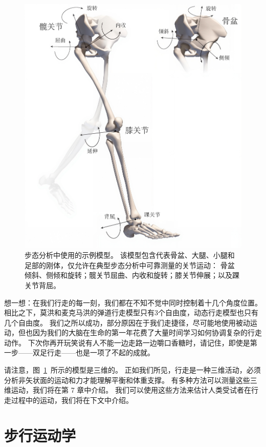 \begin{figure}[!htb]
	\centering
	\includegraphics[width=1.0\linewidth]{chap2/2_17}
	\caption{步态分析中使用的示例模型。
		该模型包含代表骨盆、大腿、小腿和足部的刚体，仅允许在典型步态分析中可靠测量的关节运动：
		骨盆倾斜、侧倾和旋转；髋关节屈曲、内收和旋转；膝关节伸展；以及踝关节背屈\cite{rajagopal2016full}。 \label{fig:2_17}}
\end{figure}


想一想：在我们行走的每一刻，我们都在不知不觉中同时控制着十几个角度位置。
相比之下，莫洪和麦克马洪的弹道行走模型只有3个自由度，动态行走模型也只有几个自由度。
我们之所以成功，部分原因在于我们走捷径，尽可能地使用被动运动，但也因为我们的大脑在生命的第一年花费了大量时间学习如何协调复杂的行走动作。
下次你再开玩笑说有人不能一边走路一边嚼口香糖时，请记住，即使是第一步——双足行走——也是一项了不起的成就。


请注意，图~\ref{fig:2_17}~所示的模型是三维的。
正如我们所见，行走是一种三维活动，必须分析非矢状面的运动和力才能理解平衡和体重支撑。
有多种方法可以测量这些三维运动，我们将在第 7 章中介绍。
我们可以使用这些方法来估计人类受试者在行走过程中的运动，我们将在下文中介绍。


\section{步行运动学}

